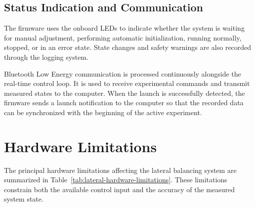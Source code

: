 \subsection{Status Indication and Communication}

The firmware uses the onboard LEDs to indicate whether the system is waiting for manual adjustment, performing automatic initialization, running normally, stopped, or in an error state. State changes and safety warnings are also recorded through the logging system.

Bluetooth Low Energy communication is processed continuously alongside the real-time control loop. It is used to receive experimental commands and transmit measured states to the computer. When the launch is successfully detected, the firmware sends a launch notification to the computer so that the recorded data can be synchronized with the beginning of the active experiment.

\section{Hardware Limitations}
\label{sec:hardware-limitations}

The principal hardware limitations affecting the lateral balancing system are summarized in Table~\ref{tab:lateral-hardware-limitations}. These limitations constrain both the available control input and the accuracy of the measured system state.

